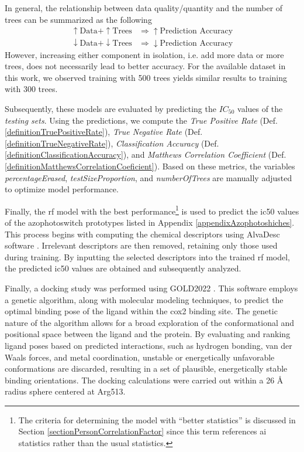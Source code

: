 \documentclass[11pt]{article}
\begin{document}
In general, the relationship between data quality/quantity and the number of trees can be summarized as the following
\begin{align*}
\uparrow\text{Data} + \uparrow\text{Trees} &\Rightarrow \uparrow\text{Prediction Accuracy} \\
\downarrow\text{Data} + \downarrow\text{Trees} &\Rightarrow \downarrow\text{Prediction Accuracy}
\end{align*}
However, increasing either component in isolation, i.e. add more data or more trees, does not necessarily lead to better accuracy. For the available dataset in this work, we observed training with 500 trees yields similar results to training with 300 trees.

Subsequently, these models are evaluated by predicting the $IC_{50}$ values of the \emph{testing sets}. Using the predictions, we compute the \emph{True Positive Rate} (Def. \ref{definitionTruePositiveRate}), \emph{True Negative Rate} (Def. \ref{definitionTrueNegativeRate}), \emph{Classification Accuracy} (Def. \ref{definitionClassificationAccuracy}), and \emph{Matthews Correlation Coefficient} (Def. \ref{definitionMatthewsCorrelationCoeficient}). Based on these metrics, the variables \emph{percentageErased}, \emph{testSizeProportion}, and \emph{numberOfTrees} are manually adjusted to optimize model performance.

Finally, the \gls{rf} model with the best performance\footnote{The criteria for determining the model with “better statistics” is discussed in Section \ref{sectionPersonCorrelationFactor} since this term references \gls{ai} statistics rather than the usual statistics.} is used to predict the \gls{ic50} values of the azophotoswitch prototypes listed in Appendix \ref{appendixAzophotoshiches}. This process begins with computing the chemical descriptors using AlvaDesc software \cite{MauriMolecularDescriptorsBook}. Irrelevant descriptors are then removed, retaining only those used during training. By inputting the selected descriptors into the trained \gls{rf} model, the predicted \gls{ic50} values are obtained and subsequently analyzed.

Finally, a docking study was performed using GOLD2022 \cite{GoldReference}. This software employs a genetic algorithm, along with molecular modeling techniques, to predict the optimal binding pose of the ligand within the \gls{cox2} binding site. The genetic nature of the algorithm allows for a broad exploration of the conformational and positional space between the ligand and the protein. By evaluating and ranking ligand poses based on predicted interactions, such as hydrogen bonding, van der Waals forces, and metal coordination, unstable or energetically unfavorable conformations are discarded, resulting in a set of plausible, energetically stable binding orientations. The docking calculations were carried out within a 26 Å radius sphere centered at Arg513.
\end{document}
